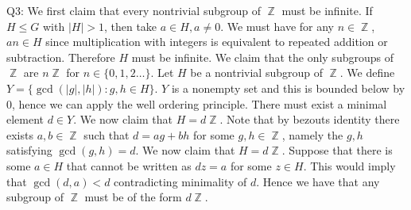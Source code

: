 \documentclass[letterpaper]{article}
\DeclareMathOperator{\Z}{\mathbb{Z}}
\begin{document}
\noindent
Q3: We first claim that every nontrivial subgroup of $\Z$ must be infinite. If $H\leq G$ with $|H|>1$, then take $a\in H, a\neq 0$. We must have for any $n\in \Z$, $an\in H$ since multiplication with integers is equivalent to repeated addition or subtraction. Therefore $H$ must be infinite. We claim that the only subgroups of $\Z$ are $n\Z$ for $n\in \{0,1,2 \dots \}$. Let $H$ be a nontrivial subgroup of $\Z$. We define $Y = \{\gcd(|g|,|h|): g,h\in H\}$. $Y$ is a nonempty set and this is bounded below by $0$, hence we can apply the well ordering principle. There must exist a minimal element $d\in Y$. We now claim that $H = d\Z$. Note that by bezouts identity there exists $a,b\in \Z$ such that $d = ag + bh$ for some $g,h\in \Z$, namely the $g,h$ satisfying $\gcd(g,h) =d$. We now claim that $H = d\Z$. Suppose that there is some $a\in H$ that cannot be written as $dz =a$ for some $z\in H$. This would imply that $\gcd(d,a)<d$ contradicting minimality of $d$. Hence we have that any subgroup of $\Z$ must be of the form $d\Z$.
\end{document}
